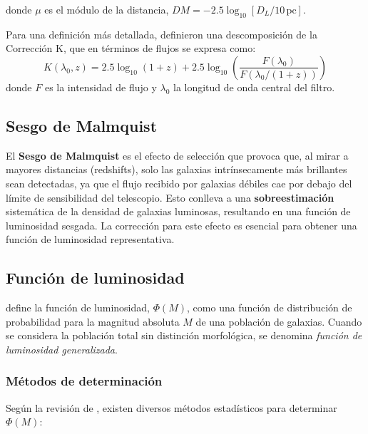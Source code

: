 \documentclass[twocolumn]{article}
\begin{document}
donde $\mu$ es el módulo de la distancia, $DM = -2.5\log_{10}\left[D_L / 10\, \text{pc}\right]$.

Para una definición más detallada, \citet{Oke&Sandage} definieron una descomposición de la Corrección K, que en términos de flujos se expresa como:
\begin{equation}
K(\lambda_0, z) = 2.5\log_{10}(1+z) + 2.5\log_{10}\left(\frac{F(\lambda_0)}{F(\lambda_0 / (1+z))}\right)
\label{eq:OkeSandage}
\end{equation}
donde $F$ es la intensidad de flujo y $\lambda_0$ la longitud de onda central del filtro.


\subsection{Sesgo de Malmquist}

El \textbf{Sesgo de Malmquist} es el efecto de selección que provoca que, al mirar a mayores distancias (redshifts), solo las galaxias intrínsecamente más brillantes sean detectadas, ya que el flujo recibido por galaxias débiles cae por debajo del límite de sensibilidad del telescopio. Esto conlleva a una \textbf{sobreestimación} sistemática de la densidad de galaxias luminosas, resultando en una función de luminosidad sesgada. La corrección para este efecto es esencial para obtener una función de luminosidad representativa.


\subsection{Función de luminosidad}

\citet{Binggeli1988} define la función de luminosidad, $\Phi(M)$, como una función de distribución de probabilidad para la magnitud absoluta $M$ de una población de galaxias. Cuando se considera la población total sin distinción morfológica, se denomina \textit{función de luminosidad generalizada}.


\subsubsection{Métodos de determinación}
Según la revisión de \citet{Binggeli1988}, existen diversos métodos estadísticos para determinar $\Phi(M)$:
\end{document}
